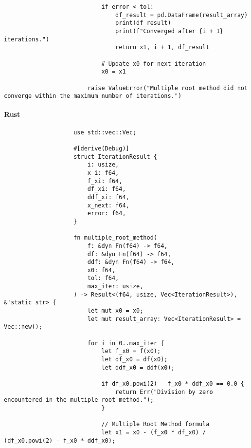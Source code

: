 \documentclass{article}
\begin{document}
\begin{verbatim}
                            if error < tol:
                                df_result = pd.DataFrame(result_array)
                                print(df_result)
                                print(f"Converged after {i + 1} iterations.")
                                return x1, i + 1, df_result

                            # Update x0 for next iteration
                            x0 = x1

                        raise ValueError("Multiple root method did not converge within the maximum number of iterations.")
                \end{verbatim}
            \paragraph{Rust}
                \begin{verbatim}
                    use std::vec::Vec;

                    #[derive(Debug)]
                    struct IterationResult {
                        i: usize,
                        x_i: f64,
                        f_xi: f64,
                        df_xi: f64,
                        ddf_xi: f64,
                        x_next: f64,
                        error: f64,
                    }

                    fn multiple_root_method(
                        f: &dyn Fn(f64) -> f64,
                        df: &dyn Fn(f64) -> f64,
                        ddf: &dyn Fn(f64) -> f64,
                        x0: f64,
                        tol: f64,
                        max_iter: usize,
                    ) -> Result<(f64, usize, Vec<IterationResult>), &'static str> {
                        let mut x0 = x0;
                        let mut result_array: Vec<IterationResult> = Vec::new();

                        for i in 0..max_iter {
                            let f_x0 = f(x0);
                            let df_x0 = df(x0);
                            let ddf_x0 = ddf(x0);

                            if df_x0.powi(2) - f_x0 * ddf_x0 == 0.0 {
                                return Err("Division by zero encountered in the multiple root method.");
                            }

                            // Multiple Root Method formula
                            let x1 = x0 - (f_x0 * df_x0) / (df_x0.powi(2) - f_x0 * ddf_x0);


\end{verbatim}
\end{document}
